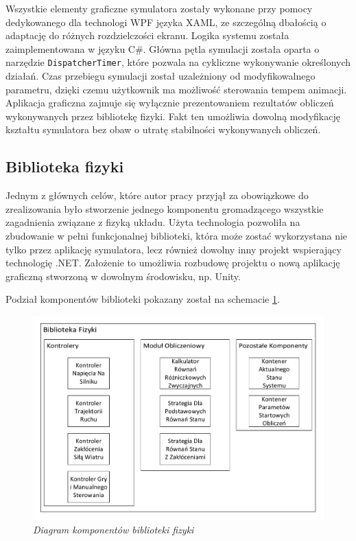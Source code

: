 \documentclass[12pt, twoside, openany]{report}
\theoremstyle{definition}
\begin{document}
\newpage
Wszystkie elementy graficzne symulatora zostały wykonane przy pomocy dedykowanego dla technologi WPF języka XAML, ze szczególną dbałością o adaptację do różnych rozdzielczości ekranu. Logika systemu została zaimplementowana w języku C\#. Główna pętla symulacji została oparta o narzędzie \texttt{DispatcherTimer}, które pozwala na cykliczne wykonywanie określonych działań. Czas przebiegu symulacji został uzależniony od modyfikowalnego parametru, dzięki czemu użytkownik ma możliwość sterowania tempem animacji. Aplikacja graficzna zajmuje się wyłącznie prezentowaniem rezultatów obliczeń wykonywanych przez bibliotekę fizyki. Fakt ten umożliwia dowolną modyfikację kształtu symulatora bez obaw o utratę stabilności wykonywanych obliczeń. 

\subsection{Biblioteka fizyki}
Jednym z głównych celów, które autor pracy przyjął za obowiązkowe do zrealizowania było stworzenie jednego komponentu gromadzącego wszystkie zagadnienia związane z fizyką układu. Użyta technologia pozwoliła na zbudowanie w pełni funkcjonalnej biblioteki, która może zostać wykorzystana nie tylko przez aplikację symulatora, lecz również dowolny inny projekt wspierający technologię .NET. Założenie to umożliwia rozbudowę projektu o nową aplikację graficzną stworzoną w dowolnym  środowisku, np. Unity. 

Podział komponentów biblioteki pokazany został na schemacie \ref{Library}.
\begin{figure}[H]
	\centering
		\includegraphics[width = 350pt]{Library} 
		\caption{\textit{Diagram komponentów biblioteki fizyki}}
		\label{Library}
\end{figure}
\end{document}
